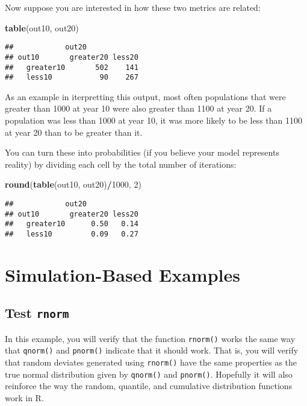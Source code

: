 \documentclass[]{book}
\newenvironment{Shaded}{\begin{snugshade}}{\end{snugshade}}
\newcommand{\KeywordTok}[1]{\textcolor[rgb]{0.13,0.29,0.53}{\textbf{#1}}}
\newcommand{\DecValTok}[1]{\textcolor[rgb]{0.00,0.00,0.81}{#1}}
\newcommand{\OperatorTok}[1]{\textcolor[rgb]{0.81,0.36,0.00}{\textbf{#1}}}
\newcommand{\NormalTok}[1]{#1}
\theoremstyle{definition}
\theoremstyle{definition}
\theoremstyle{definition}
\theoremstyle{remark}
\begin{document}
Now suppose you are interested in how these two metrics are related:

\begin{Shaded}
\begin{Highlighting}[]
\KeywordTok{table}\NormalTok{(out10, out20)}
\end{Highlighting}
\end{Shaded}

\begin{verbatim}
##            out20
## out10       greater20 less20
##   greater10       502    141
##   less10           90    267
\end{verbatim}

As an example in iterpretting this output, most often populations that
were greater than 1000 at year 10 were also greater than 1100 at year
20. If a population was less than 1000 at year 10, it was more likely to
be less than 1100 at year 20 than to be greater than it.

You can turn these into probabilities (if you believe your model
represents reality) by dividing each cell by the total number of
iterations:

\begin{Shaded}
\begin{Highlighting}[]
\KeywordTok{round}\NormalTok{(}\KeywordTok{table}\NormalTok{(out10, out20)}\OperatorTok{/}\DecValTok{1000}\NormalTok{, }\DecValTok{2}\NormalTok{)}
\end{Highlighting}
\end{Shaded}

\begin{verbatim}
##            out20
## out10       greater20 less20
##   greater10      0.50   0.14
##   less10         0.09   0.27
\end{verbatim}

\section{Simulation-Based Examples}\label{sim-examples}

\subsection{\texorpdfstring{Test
\texttt{rnorm}}{Test rnorm}}\label{rnorm-ex}

In this example, you will verify that the function \texttt{rnorm()}
works the same way that \texttt{qnorm()} and \texttt{pnorm()} indicate
that it should work. That is, you will verify that random deviates
generated using \texttt{rnorm()} have the same properties as the true
normal distribution given by \texttt{qnorm()} and \texttt{pnorm()}.
Hopefully it will also reinforce the way the random, quantile, and
cumulative distribution functions work in R.
\end{document}
